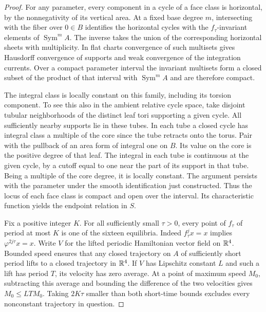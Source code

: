 \begin{proof}
For any parameter, every component in a cycle of a face class is
horizontal, by the nonnegativity of its vertical area. At a fixed
base degree $m$, intersecting with the fiber over $0\in B$ identifies
the horizontal cycles with the $f_\tau$-invariant elements of
$\operatorname{Sym}^m A$. The inverse takes the union of the
corresponding horizontal sheets with multiplicity. In flat charts
convergence of such multisets gives Hausdorff convergence of supports
and weak convergence of the integration currents. Over a compact
parameter interval the invariant multisets form a closed subset of
the product of that interval with $\operatorname{Sym}^m A$ and are
therefore compact.

The integral class is locally constant on this family, including its
torsion component. To see this also in the ambient relative cycle
space, take disjoint tubular neighborhoods of the distinct leaf
tori supporting a given cycle. All sufficiently nearby supports lie
in these tubes. In each tube a closed cycle has integral class a
multiple of the core since the tube retracts onto the torus. Pair
with the pullback of an area form of integral one on $B$. Its value
on the core is the positive degree of that leaf. The integral in
each tube is continuous at the given cycle, by a cutoff equal to
one near the part of its support in that tube. Being a multiple of
the core degree, it is locally constant. The argument persists with
the parameter under the smooth identification just constructed.
Thus the locus of each face class is compact and open over the
interval. Its characteristic function yields the endpoint relation
in $S$.

Fix a positive integer $K$. For all sufficiently small $\tau>0$,
every point of $f_\tau$ of period at most $K$ is one of the sixteen
equilibria. Indeed $f_\tau^j x=x$ implies
$\varphi^{2j\tau}x=x$. Write $V$ for the lifted periodic Hamiltonian
vector field on $\mathbb R^4$. Bounded speed ensures that any closed
trajectory on $A$ of sufficiently short period lifts to a closed
trajectory in $\mathbb R^4$. If $V$ has Lipschitz constant $L$ and such a
lift has period $T$, its velocity has zero average. At a point of
maximum speed $M_0$, subtracting this average and bounding the
difference of the two velocities gives $M_0\le LT M_0$. Taking
$2K\tau$ smaller than both short-time bounds excludes every
nonconstant trajectory in question.


\end{proof}
